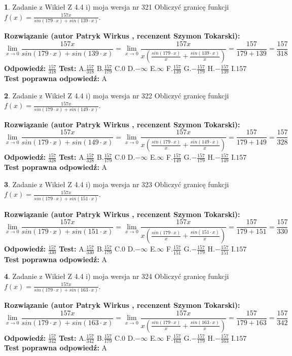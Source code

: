 \documentclass[12pt, a4paper]{article}
\theoremstyle{definition} %
\newtheorem{zad}{}
\newcommand{\zadStart}[1]{\begin{zad}#1\newline}
\newcommand{\zadStop}{\end{zad}}
\newcommand{\rozwStart}[2]{\noindent \textbf{Rozwiązanie (autor #1 , recenzent #2): }\newline}
\newcommand{\rozwStop}{\newline}
\newcommand{\odpStart}{\noindent \textbf{Odpowiedź:}\newline}
\newcommand{\odpStop}{\newline}
\newcommand{\testStart}{\noindent \textbf{Test:}\newline}
\newcommand{\testStop}{\newline}
\newcommand{\kluczStart}{\noindent \textbf{Test poprawna odpowiedź:}\newline}
\newcommand{\kluczStop}{\newline}
\begin{document}
\zadStart{Zadanie z Wikieł Z 4.4 i) moja wersja nr 321}
Obliczyć granicę funkcji $f(x)=\frac{157x}{sin(179\cdot x) +sin(139\cdot x)}$.
\zadStop
\rozwStart{Patryk Wirkus}{Szymon Tokarski}
$$\lim\limits_{x\to 0}\frac{157x}{sin(179\cdot x) +sin(139\cdot x)}=\lim\limits_{x\to 0}\frac{157x}{x(\frac{sin(179\cdot x)}{x}+\frac{sin(139\cdot x)}{x})}=\frac{157}{179+139} = \frac{157}{318}$$
\rozwStop
\odpStart
$\frac{157}{318}$
\odpStop
\testStart
A.$\frac{157}{318}$
B.$\frac{157}{179}$
C.$0$
D.$-\infty$
E.$\infty$
F.$\frac{157}{139}$
G.$-\frac{157}{179}$
H.$-\frac{157}{139}$
I.$157$
\testStop
\kluczStart
A
\kluczStop



\zadStart{Zadanie z Wikieł Z 4.4 i) moja wersja nr 322}
Obliczyć granicę funkcji $f(x)=\frac{157x}{sin(179\cdot x) +sin(149\cdot x)}$.
\zadStop
\rozwStart{Patryk Wirkus}{Szymon Tokarski}
$$\lim\limits_{x\to 0}\frac{157x}{sin(179\cdot x) +sin(149\cdot x)}=\lim\limits_{x\to 0}\frac{157x}{x(\frac{sin(179\cdot x)}{x}+\frac{sin(149\cdot x)}{x})}=\frac{157}{179+149} = \frac{157}{328}$$
\rozwStop
\odpStart
$\frac{157}{328}$
\odpStop
\testStart
A.$\frac{157}{328}$
B.$\frac{157}{179}$
C.$0$
D.$-\infty$
E.$\infty$
F.$\frac{157}{149}$
G.$-\frac{157}{179}$
H.$-\frac{157}{149}$
I.$157$
\testStop
\kluczStart
A
\kluczStop



\zadStart{Zadanie z Wikieł Z 4.4 i) moja wersja nr 323}
Obliczyć granicę funkcji $f(x)=\frac{157x}{sin(179\cdot x) +sin(151\cdot x)}$.
\zadStop
\rozwStart{Patryk Wirkus}{Szymon Tokarski}
$$\lim\limits_{x\to 0}\frac{157x}{sin(179\cdot x) +sin(151\cdot x)}=\lim\limits_{x\to 0}\frac{157x}{x(\frac{sin(179\cdot x)}{x}+\frac{sin(151\cdot x)}{x})}=\frac{157}{179+151} = \frac{157}{330}$$
\rozwStop
\odpStart
$\frac{157}{330}$
\odpStop
\testStart
A.$\frac{157}{330}$
B.$\frac{157}{179}$
C.$0$
D.$-\infty$
E.$\infty$
F.$\frac{157}{151}$
G.$-\frac{157}{179}$
H.$-\frac{157}{151}$
I.$157$
\testStop
\kluczStart
A
\kluczStop



\zadStart{Zadanie z Wikieł Z 4.4 i) moja wersja nr 324}
Obliczyć granicę funkcji $f(x)=\frac{157x}{sin(179\cdot x) +sin(163\cdot x)}$.
\zadStop
\rozwStart{Patryk Wirkus}{Szymon Tokarski}
$$\lim\limits_{x\to 0}\frac{157x}{sin(179\cdot x) +sin(163\cdot x)}=\lim\limits_{x\to 0}\frac{157x}{x(\frac{sin(179\cdot x)}{x}+\frac{sin(163\cdot x)}{x})}=\frac{157}{179+163} = \frac{157}{342}$$
\rozwStop
\odpStart
$\frac{157}{342}$
\odpStop
\testStart
A.$\frac{157}{342}$
B.$\frac{157}{179}$
C.$0$
D.$-\infty$
E.$\infty$
F.$\frac{157}{163}$
G.$-\frac{157}{179}$
H.$-\frac{157}{163}$
I.$157$
\testStop
\kluczStart
A
\kluczStop
\end{document}
